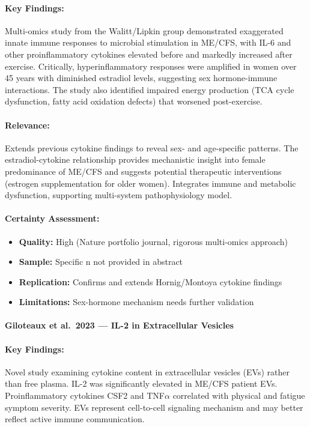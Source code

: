 \cite{Che2025}

\paragraph{Key Findings:}
Multi-omics study from the Walitt/Lipkin group demonstrated exaggerated innate immune responses to microbial stimulation in ME/CFS, with IL-6 and other proinflammatory cytokines elevated before and markedly increased after exercise. Critically, hyperinflammatory responses were amplified in women over 45 years with diminished estradiol levels, suggesting sex hormone-immune interactions. The study also identified impaired energy production (TCA cycle dysfunction, fatty acid oxidation defects) that worsened post-exercise.

\paragraph{Relevance:}
Extends previous cytokine findings to reveal sex- and age-specific patterns. The estradiol-cytokine relationship provides mechanistic insight into female predominance of ME/CFS and suggests potential therapeutic interventions (estrogen supplementation for older women). Integrates immune and metabolic dysfunction, supporting multi-system pathophysiology model.

\paragraph{Certainty Assessment:}
\begin{itemize}
    \item \textbf{Quality:} High (Nature portfolio journal, rigorous multi-omics approach)
    \item \textbf{Sample:} Specific n not provided in abstract
    \item \textbf{Replication:} Confirms and extends Hornig/Montoya cytokine findings
    \item \textbf{Limitations:} Sex-hormone mechanism needs further validation
\end{itemize}

\paragraph{Giloteaux et al.\ 2023 --- IL-2 in Extracellular Vesicles}

\cite{Giloteaux2023}

\paragraph{Key Findings:}
Novel study examining cytokine content in extracellular vesicles (EVs) rather than free plasma. IL-2 was significantly elevated in ME/CFS patient EVs. Proinflammatory cytokines CSF2 and TNF$\alpha$ correlated with physical and fatigue symptom severity. EVs represent cell-to-cell signaling mechanism and may better reflect active immune communication.

